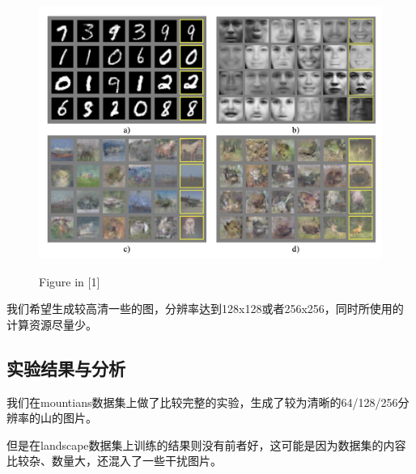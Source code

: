 \documentclass{article}
\begin{document}
\begin{CJK*}{UTF8}{gbsn}
	\begin{figure}[htbp]
		\begin{minipage}{0.5\linewidth}
			\label{m1}
			\centering\includegraphics[scale=0.35]{res/base.png}
			\caption{Figure in [1]}
		\end{minipage}
	\end{figure}

	我们希望生成较高清一些的图，分辨率达到128x128或者256x256，同时所使用的计算资源尽量少。

  \subsection{实验结果与分析}

	我们在mountians数据集上做了比较完整的实验，生成了较为清晰的64/128/256分辨率的山的图片。
	
	但是在landscape数据集上训练的结果则没有前者好，这可能是因为数据集的内容比较杂、数量大，还混入了一些干扰图片。


\end{CJK*}
\end{document}
